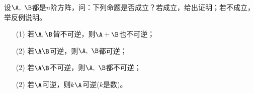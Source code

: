 \begin{frame}
  \begin{footnotesize}
    \begin{exampleblock}{44}
      设$\A,~\B$都是$n$阶方阵，问：下列命题是否成立？若成立，给出证明；若不成立，举反例说明。
      \begin{itemize}
      \item[(1)]若$\A,\B$皆不可逆，则$\A+\B$也不可逆；
      \item[(2)]若$\A\B$可逆，则$\A,~\B$都可逆；
      \item[(2)]若$\A\B$不可逆，则$\A,~\B$都不可逆；
      \item[(2)]若$\A$可逆，则$k\A$可逆($k$是数)。
      \end{itemize}
    \end{exampleblock}
  \end{footnotesize}
\end{frame}



\begin{frame}
  \begin{footnotesize}
    \begin{exampleblock}{28}
      
    \end{exampleblock}
  \end{footnotesize}
\end{frame}



\begin{frame}
  \begin{footnotesize}
    \begin{exampleblock}{28}
      
    \end{exampleblock}
  \end{footnotesize}
\end{frame}



\begin{frame}
  \begin{footnotesize}
    \begin{exampleblock}{28}
      
    \end{exampleblock}
  \end{footnotesize}
\end{frame}



\begin{frame}
  \begin{footnotesize}
    \begin{exampleblock}{28}
      
    \end{exampleblock}
  \end{footnotesize}
\end{frame}


